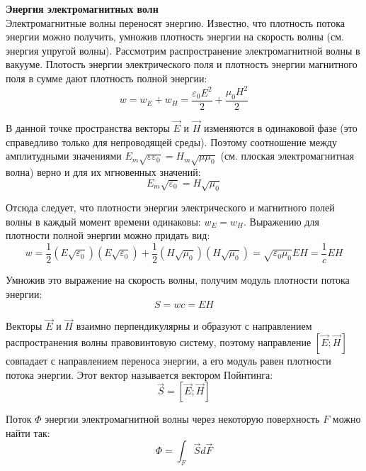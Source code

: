\documentclass{article}
\begin{document}
	
	\textbf{Энергия электромагнитных волн}\\

	Электромагнитные волны переносят энергию. Известно, что плотность потока энергии можно получить, умножив плотность энергии на скорость волны (см. энергия упругой волны). Рассмотрим распространение электромагнитной волны в вакууме. Плотость энергии электрического поля и плотность энергии магнитного поля в сумме дают плотность полной энергии:
	\begin{equation}
		w=w_E+w_H=\frac{\varepsilon_0E^2}{2}+\frac{\mu_0H^2}{2}
	\end{equation}

	В данной точке пространства векторы $\vec E$ и $\vec H$ изменяются в одинаковой фазе (это справедливо только для непроводящей среды). Поэтому соотношение между амплитудными значениями $E_m\sqrt{\varepsilon\varepsilon_0}=H_m\sqrt{\mu\mu_0}$ (см. плоская электромагнитная волна) верно и для их мгновенных значений:
	\begin{equation}
		E_m\sqrt{\varepsilon_0}=H\sqrt{\mu_0}
	\end{equation}

	Отсюда следует, что плотности энергии электрического и магнитного полей волны в каждый момент времени одинаковы: $w_E=w_H$. Выражению для плотности полной энергии можно придать вид:
	\begin{equation}
		w=\frac{1}{2}(E\sqrt{\varepsilon_0})(E\sqrt{\varepsilon_0})+\frac{1}{2}(H\sqrt{\mu_0})(H\sqrt{\mu_0})=\sqrt{\varepsilon_0\mu_0}EH=\frac{1}{c}EH
	\end{equation}

	Умножив это выражение на скорость волны, получим модуль плотности потока энергии:
	\begin{equation}
		S = wc = EH
	\end{equation}

	Векторы $\vec E$ и $\vec H$ взаимно перпендикулярны и образуют с направлением распространения волны правовинтовую систему, поэтому направление $[\vec E;\vec H]$ совпадает с направлением переноса энергии, а его модуль равен плотности потока энергии. Этот вектор называется вектором Пойнтинга:
	\begin{equation}
		\vec S = [\vec E;\vec H]
	\end{equation}

	Поток $\Phi$ энергии электромагнитной волны через некоторую поверхность $F$ можно найти так:
	\begin{equation}
		\Phi = \int_F \vec Sd\vec F
	\end{equation}
\end{document}
